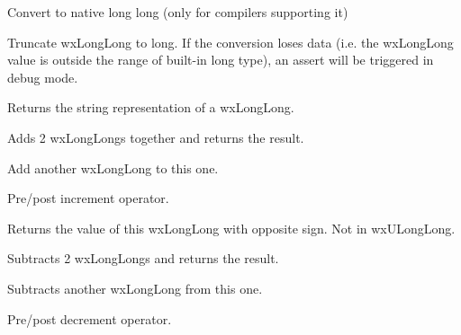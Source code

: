 \label{wxlonglonggetvalue}


Convert to native long long (only for compilers supporting it)

\label{wxlonglongtolong}


Truncate wxLongLong to long. If the conversion loses data (i.e. the wxLongLong
value is outside the range of built-in long type), an assert will be triggered
in debug mode.

\label{wxlonglongtostring}


Returns the string representation of a wxLongLong.

\label{wxlonglongoperatorplus}


Adds 2 wxLongLongs together and returns the result.

\label{wxlonglongoperatorplusassign}


Add another wxLongLong to this one.

\label{wxlonglongoperatorinc}



Pre/post increment operator.

\label{wxlonglongoperatorunaryminus}


Returns the value of this wxLongLong with opposite sign.  Not in wxULongLong.

\label{wxlonglongoperatorminus}


Subtracts 2 wxLongLongs and returns the result.

\label{wxlonglongoperatorminusassign}


Subtracts another wxLongLong from this one.

\label{wxlonglongoperatordec}



Pre/post decrement operator.


